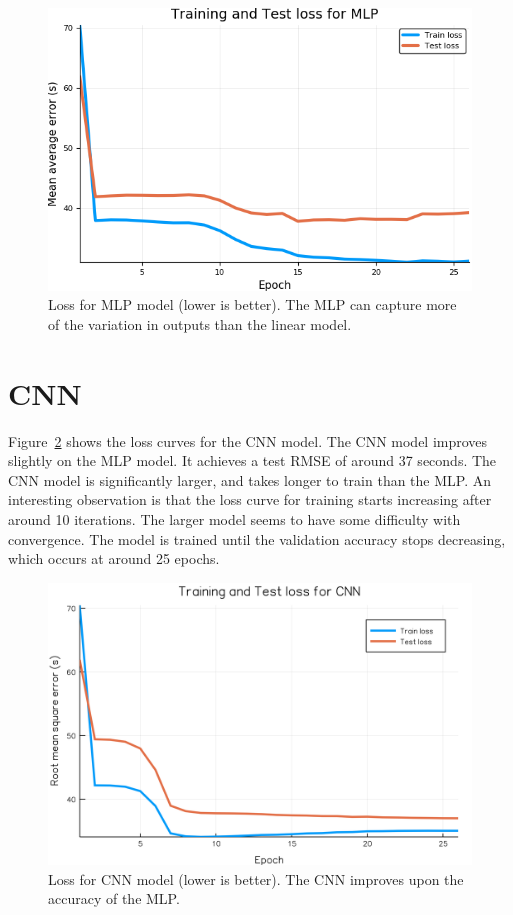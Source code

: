 \begin{figure}
\includegraphics[width=\linewidth]{images/mlp_loss.png}
\caption{Loss for MLP model (lower is better). The MLP can capture more of the variation in outputs than the linear model.}
\label{mlp_loss}
\end{figure}
\clearpage
\newpage

\section{CNN}

Figure~\ref{cnn_loss} shows the loss curves for the CNN model.
The CNN model improves slightly on the MLP model.
It achieves a test RMSE of around 37 seconds.
The CNN model is significantly larger, and takes longer to train than the MLP.
An interesting observation is that the loss curve for training starts increasing after around 10 iterations.
The larger model seems to have some difficulty with convergence.
The model is trained until the validation accuracy stops decreasing, which occurs at around 25 epochs.

\begin{figure}
\includegraphics[width=\linewidth]{images/cnn_loss.png}
\caption{Loss for CNN model (lower is better). The CNN improves upon the accuracy of the MLP.}
\label{cnn_loss}
\end{figure}
\clearpage
\newpage

